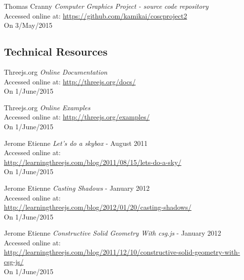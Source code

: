 \begin{thebibliography}{99}

    Thomas Cranny
    \textit{Computer Graphics Project - source code repository}\\
    Accessed online at:
    \href{https://github.com/kamikai/cosc_project2}{https://github.com/kamikai/cosc{\textunderscore}project2}\\
    On 3/May/2015

\subsection{Technical Resources}
\label{ref:technical_resources}

        Threejs.org
        \textit{Online Documentation}\\
        Accessed online at:
        \href{http://threejs.org/docs/}{http://threejs.org/docs/}\\
        On 1/June/2015

        Threejs.org
        \textit{Online Examples}\\
        Accessed online at:
        \href{http://threejs.org/examples/}{http://threejs.org/examples/}\\
        On 1/June/2015

        Jerome Etienne
        \textit{Let's do a skybox} - August 2011 \\
        Accessed online at: \\
        \href{http://learningthreejs.com/blog/2011/08/15/lets-do-a-sky/}{http://learningthreejs.com/blog/2011/08/15/lets-do-a-sky/}\\
        On 1/June/2015

        Jerome Etienne
        \textit{Casting Shadows} - January 2012 \\
        Accessed online at: \\
        \href{http://learningthreejs.com/blog/2012/01/20/casting-shadows/}{http://learningthreejs.com/blog/2012/01/20/casting-shadows/}\\
        On 1/June/2015

        Jerome Etienne
        \textit{Constructive Solid Geometry With csg.js} - January 2012 \\
        Accessed online at: \\
        \href{http://learningthreejs.com/blog/2011/12/10/constructive-solid-geometry-with-csg-js/}{http://learningthreejs.com/blog/2011/12/10/constructive-solid-geometry-with-csg-js/}\\
        On 1/June/2015


\end{thebibliography}
